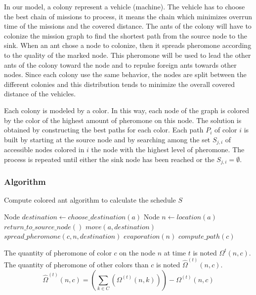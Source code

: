\documentclass[a4paper,10pt]{article}
\begin{document}
In our model, a colony represent a vehicle (machine). The vehicle has to choose the best chain of missions to process, it means the chain which minimizes overrun time of the missions and the covered distance. The ants of the colony will have to colonize the mission graph to find the shortest path from the source node to the sink. When an ant chose a node to colonize, then it spreads pheromone according to the quality of the marked node. This pheromone will be used to lead the other ants of the colony toward the node and to repulse foreign ants towards other nodes.
Since each colony use the same behavior, the nodes are split between the different colonies and this distribution tends to minimize the overall covered distance of the vehicles.

Each colony is modeled by a color. In this way, each node of the graph is colored by the color of the highest amount of pheromone on this node. The solution is obtained by constructing the best paths for each color. Each path $P_i$ of color $i$ is built by starting at the source node and by searching among the set $S_{j,i}$ of accessible nodes colored in $i$ the node with the highest level of pheromone. The process is repeated until either the sink node has been reached or the $S_{j,i} = \emptyset$.

\subsubsection{Algorithm}


\begin{algorithm}
\caption{Compute colored ant algorithm to calculate the schedule $S$}
\label{algo1}
\begin{algorithmic} 
\STATE Node $destination \leftarrow choose\_destination(a)$
\STATE Node $n \leftarrow location(a)$
\STATE $return\_to\_source\_node()$
\ELSE
\STATE $move(a, destination)$
\STATE $spread\_pheromone(c, n, destination)$
\ENDIF
\ENDFOR
{}
\STATE $evaporation(n)$
\ENDFOR
{}
\STATE $compute\_path(c)$
\ENDFOR
\end{algorithmic}
\end{algorithm}


The quantity of pheromone of color $c$ on the node $n$ at time $t$ is noted $\Omega^{t}(n,c)$. The quantity of pheromone of other colors than $c$ is noted $\hat \Omega^{(t)}(n,c)$.
\begin{equation*}
    \hat \Omega^{(t)}(n,c) = \left( \sum_{k \in C}(\Omega^{(t)} (n,k)) \right) - \Omega^{(t)} (n,c)
\end{equation*}
\end{document}

